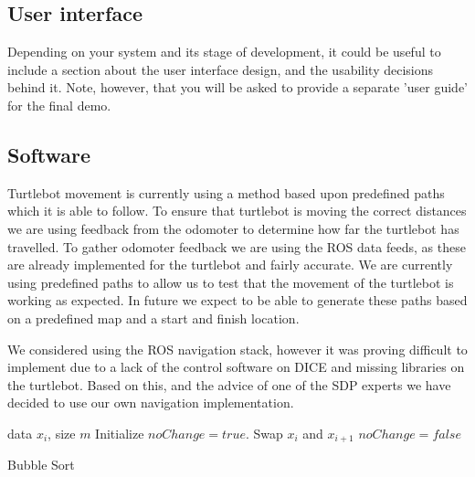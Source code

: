 \documentclass{article}
\begin{document}
\subsection{User interface}

Depending on your system and its stage of development, it could be useful to include a section about the user interface design, and the usability decisions behind it. Note, however, that you will be asked to provide a separate 'user guide' for the final demo.

\subsection{Software}



Turtlebot movement is currently using a method based upon predefined paths which it is able to follow. 
To ensure that turtlebot is moving the correct distances we are using feedback from the odomoter to determine how far the turtlebot has travelled.
To gather odomoter feedback we are using the ROS data feeds, as these are already implemented for the turtlebot and fairly accurate.
We are currently using predefined paths to allow us to test that the movement of the turtlebot is working as expected. In future we expect to be able to generate these paths based on a predefined map and a start and finish location.

We considered using the ROS navigation stack, however it was proving difficult to implement due to a lack of the control software on DICE and missing libraries on the turtlebot. 
Based on this, and the advice of one of the SDP experts we have decided to use our own navigation implementation.

\begin{algorithm}[ht]
\begin{algorithmic}
    data $x_i$, size $m$
   \REPEAT
   \STATE Initialize $noChange = true$.
   \STATE Swap $x_i$ and $x_{i+1}$
   \STATE $noChange = false$
   \ENDIF
   \ENDFOR
\end{algorithmic}
  \caption{Bubble Sort}
  \label{alg:example}
\end{algorithm}
\end{document}
